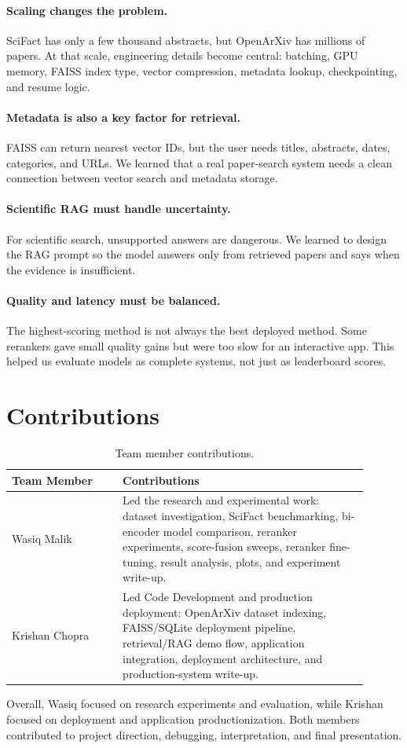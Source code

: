 \documentclass[11pt,a4paper]{article}
\begin{document}
\paragraph{Scaling changes the problem.}
SciFact has only a few thousand abstracts, but OpenArXiv has millions of papers. At that scale, engineering details become central: batching, GPU memory, FAISS index type, vector compression, metadata lookup, checkpointing, and resume logic.

\paragraph{Metadata is also a key factor for retrieval.}
FAISS can return nearest vector IDs, but the user needs titles, abstracts, dates, categories, and URLs. We learned that a real paper-search system needs a clean connection between vector search and metadata storage.

\paragraph{Scientific RAG must handle uncertainty.}
For scientific search, unsupported answers are dangerous. We learned to design the RAG prompt so the model answers only from retrieved papers and says when the evidence is insufficient.

\paragraph{Quality and latency must be balanced.}
The highest-scoring method is not always the best deployed method. Some rerankers gave small quality gains but were too slow for an interactive app. This helped us evaluate models as complete systems, not just as leaderboard scores.

\section{Contributions}

\begin{table}[H]
\centering
\small
\begin{tabular}{p{0.28\linewidth}p{0.62\linewidth}}
\toprule
Team Member & Contributions \\
\midrule
Wasiq Malik & Led the research and experimental work: dataset investigation, SciFact benchmarking, bi-encoder model comparison, reranker experiments, score-fusion sweeps, reranker fine-tuning, result analysis, plots, and experiment write-up. \\
Krishan Chopra & Led Code Development and production deployment: OpenArXiv dataset indexing, FAISS/SQLite deployment pipeline, retrieval/RAG demo flow, application integration, deployment architecture, and production-system write-up. \\
\bottomrule
\end{tabular}
\caption{Team member contributions.}
\label{tab:contributions}
\end{table}

Overall, Wasiq focused on research experiments and evaluation, while Krishan focused on deployment and application productionization. Both members contributed to project direction, debugging, interpretation, and final presentation.
\end{document}
